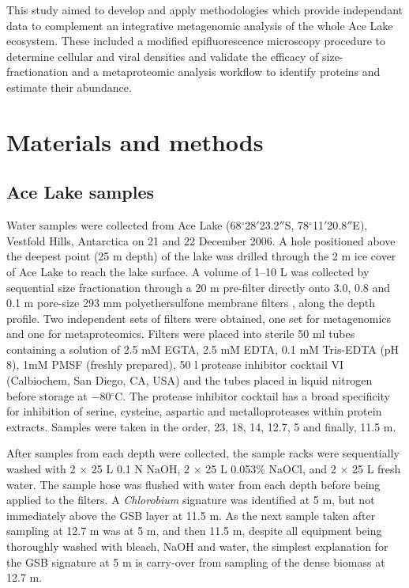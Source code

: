 This study aimed to develop and apply methodologies which provide independant data to complement an integrative metagenomic analysis of the whole Ace Lake ecosystem.
These included a modified epifluorescence microscopy procedure to determine cellular and viral densities and validate the efficacy of size-fractionation and a metaproteomic analysis workflow to identify proteins and estimate their abundance.


\section{Materials and methods}
\label{sec:ace_mm}
\subsection{Ace Lake samples}
Water samples were collected from Ace Lake (68$^{\circ}$28$'$23.2$''$S, 78$^{\circ}$11$'$20.8$''$E), Vestfold Hills, Antarctica on 21 and 22 December 2006. 
A hole positioned above the deepest point (25 m depth) of the lake was drilled through the 2 m ice cover of Ace Lake to reach the lake surface.
A volume of 1--10 L was collected by sequential size fractionation through a 20 \textmu{}m pre-filter directly onto 3.0, 0.8 and 0.1 \textmu{}m pore-size 293 mm polyethersulfone membrane filters \cite{Rusch2007}, along the depth profile.
Two independent sets of filters were obtained, one set for metagenomics and one for metaproteomics.
Filters were placed into sterile 50 ml tubes containing a solution of 2.5 mM EGTA, 2.5 mM EDTA, 0.1 mM Tris-EDTA (pH 8), 1mM PMSF (freshly prepared), 50 \textmu{}l protease inhibitor cocktail VI (Calbiochem, San Diego, \textsc{CA}, \textsc{USA}) and the tubes placed in liquid nitrogen before storage at $-$80$^{\circ}$C.
The protease inhibitor cocktail has a broad specificity for inhibition of serine, cysteine, aspartic and metalloproteases within protein extracts.
Samples were taken in the order, 23, 18, 14, 12.7, 5 and finally, 11.5 m.

After samples from each depth were collected, the sample racks were sequentially washed with 2 $\times$ 25 L 0.1 N NaOH, 2 $\times$ 25 L 0.053\% NaOCl, and 2 $\times$ 25 L fresh water. 
The sample hose was flushed with water from each depth before being applied to the filters. 
A \emph{Chlorobium} signature was identified at 5 m, but not immediately above the \ac{GSB} layer at 11.5 m. 
As the next sample taken after sampling at 12.7 m was at 5 m, and then 11.5 m, despite all equipment being thoroughly washed with bleach, NaOH and water, 
the simplest explanation for the \ac{GSB} signature at 5 m is carry-over from sampling of the dense biomass at 12.7 m. 

